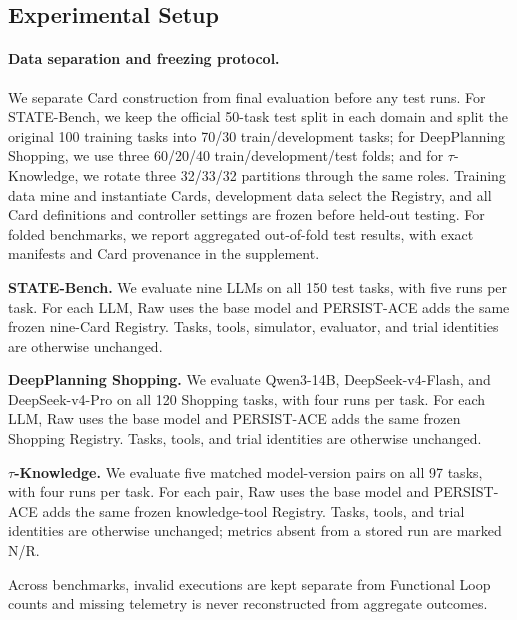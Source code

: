 \subsection*{Experimental Setup}

\paragraph{Data separation and freezing protocol.}
We separate Card construction from final evaluation before any test runs. For
STATE-Bench, we keep the official 50-task test split in each domain and split
the original 100 training tasks into 70/30 train/development tasks; for
DeepPlanning Shopping, we use three 60/20/40 train/development/test folds; and
for $\tau$-Knowledge, we rotate three 32/33/32 partitions through the same
roles. Training data mine and instantiate Cards, development data select the
Registry, and all Card definitions and controller settings are frozen before
held-out testing. For folded benchmarks, we report aggregated out-of-fold test
results, with exact manifests and Card provenance in the supplement.

\textbf{STATE-Bench.} We evaluate nine LLMs on all 150 test tasks, with five
runs per task. For each LLM, Raw uses the base model and PERSIST-ACE adds the
same frozen nine-Card Registry. Tasks, tools, simulator, evaluator, and trial
identities are otherwise unchanged.

\textbf{DeepPlanning Shopping.} We evaluate Qwen3-14B,
DeepSeek-v4-Flash, and DeepSeek-v4-Pro on all 120 Shopping tasks, with four
runs per task. For each LLM, Raw uses the base model and PERSIST-ACE adds the
same frozen Shopping Registry. Tasks, tools, and trial identities are otherwise
unchanged.

\textbf{$\tau$-Knowledge.} We evaluate five matched model-version pairs on all
97 tasks, with four runs per task. For each pair, Raw uses the base model and
PERSIST-ACE adds the same frozen knowledge-tool Registry. Tasks, tools, and
trial identities are otherwise unchanged; metrics absent from a stored run are
marked N/R.

Across benchmarks, invalid executions are kept separate from Functional Loop counts and
missing telemetry is never reconstructed from aggregate outcomes.

